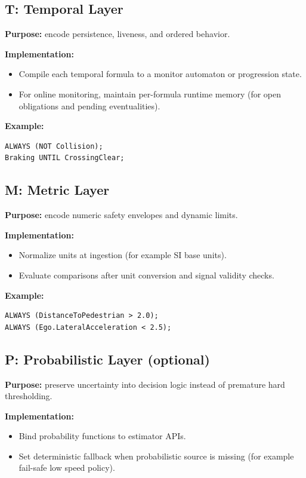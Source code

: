 \documentclass[11pt,a4paper]{article}
\begin{document}
\subsection{T: Temporal Layer}
\textbf{Purpose:} encode persistence, liveness, and ordered behavior.

\textbf{Implementation:}
\begin{itemize}[leftmargin=*]
  \item Compile each temporal formula to a monitor automaton or progression state.
  \item For online monitoring, maintain per-formula runtime memory (for open obligations and pending eventualities).
\end{itemize}

\textbf{Example:}
\begin{lstlisting}
ALWAYS (NOT Collision);
Braking UNTIL CrossingClear;
\end{lstlisting}

\subsection{M: Metric Layer}
\textbf{Purpose:} encode numeric safety envelopes and dynamic limits.

\textbf{Implementation:}
\begin{itemize}[leftmargin=*]
  \item Normalize units at ingestion (for example SI base units).
  \item Evaluate comparisons after unit conversion and signal validity checks.
\end{itemize}

\textbf{Example:}
\begin{lstlisting}
ALWAYS (DistanceToPedestrian > 2.0);
ALWAYS (Ego.LateralAcceleration < 2.5);
\end{lstlisting}

\subsection{P: Probabilistic Layer (optional)}
\textbf{Purpose:} preserve uncertainty into decision logic instead of premature hard thresholding.

\textbf{Implementation:}
\begin{itemize}[leftmargin=*]
  \item Bind probability functions to estimator APIs.
  \item Set deterministic fallback when probabilistic source is missing (for example fail-safe low speed policy).
\end{itemize}
\end{document}
